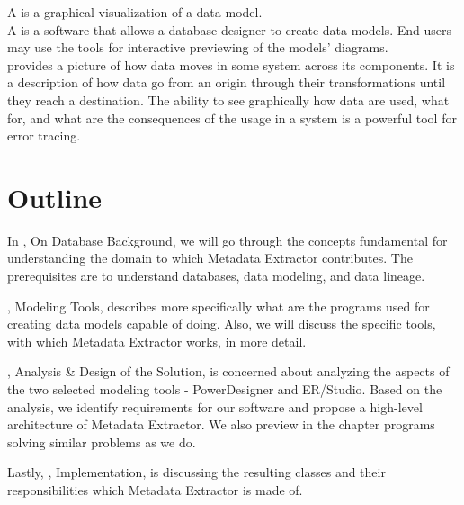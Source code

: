 A  is a graphical visualization of a data model. \\

A  is a software that allows a database designer to create data models. End users may use the tools for interactive previewing of the models' diagrams. \\

 provides a picture of how data moves in some system across its components. It is a description of how data go from an origin through their transformations until they reach a destination. 
The ability to see graphically how data are used, what for, and what are the consequences of the usage in a system is a powerful tool for error tracing. \\

\section{Outline}

In , On Database Background, we will go through the concepts fundamental for understanding the domain to which Metadata Extractor contributes. The prerequisites are to understand databases, data modeling, and data lineage.

, Modeling Tools, describes more specifically what are the programs used for creating data models capable of doing.
Also, we will discuss the specific tools, with which Metadata Extractor works, in more detail.

, Analysis \& Design of the Solution, is concerned about analyzing the aspects of the two selected modeling tools - PowerDesigner and ER/Studio. 
Based on the analysis, we identify requirements for our software and propose a high-level architecture of Metadata Extractor. 
We also preview in the chapter programs solving similar problems as we do.

Lastly, , Implementation, is discussing the resulting classes and their responsibilities which Metadata Extractor is made of.


